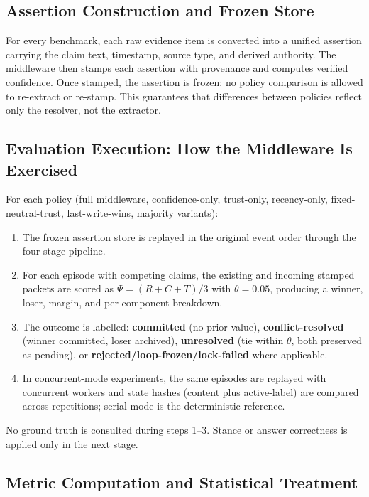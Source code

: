 \documentclass[12pt,a4paper]{article}
\begin{document}
\subsection{Assertion Construction and Frozen Store}
For every benchmark, each raw evidence item is converted into a unified assertion carrying the claim text, timestamp, source type, and derived authority. The middleware then stamps each assertion with provenance and computes verified confidence. Once stamped, the assertion is frozen: no policy comparison is allowed to re-extract or re-stamp. This guarantees that differences between policies reflect only the resolver, not the extractor.

\subsection{Evaluation Execution: How the Middleware Is Exercised}

For each policy (full middleware, confidence-only, trust-only, recency-only, fixed-neutral-trust, last-write-wins, majority variants):

\begin{enumerate}[leftmargin=*]
  \item The frozen assertion store is replayed in the original event order through the four-stage pipeline.
  \item For each episode with competing claims, the existing and incoming stamped packets are scored as $\Psi=(R+C+T)/3$ with $\theta=0.05$, producing a winner, loser, margin, and per-component breakdown.
  \item The outcome is labelled: \textbf{committed} (no prior value), \textbf{conflict-resolved} (winner committed, loser archived), \textbf{unresolved} (tie within $\theta$, both preserved as pending), or \textbf{rejected/loop-frozen/lock-failed} where applicable.
  \item In concurrent-mode experiments, the same episodes are replayed with concurrent workers and state hashes (content plus active-label) are compared across repetitions; serial mode is the deterministic reference.
\end{enumerate}

No ground truth is consulted during steps 1--3. Stance or answer correctness is applied only in the next stage.

\subsection{Metric Computation and Statistical Treatment}
\end{document}
